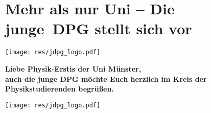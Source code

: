 \section[Die junge DPG stellt sich vor]{Mehr als nur Uni -- Die junge~DPG stellt sich vor}
\begin{minipage}{0.1\textwidth}
    \texttt{[image: res/jdpg\_logo.pdf]}
\end{minipage}\hfill
\begin{minipage}{0.75\textwidth}
    \centering
    \textbf{Liebe Physik-Erstis der Uni Münster,\\
    auch die junge DPG möchte Euch herzlich im Kreis der Physikstudierenden begrüßen.}
\end{minipage}\hfill
\begin{minipage}{0.1\textwidth}
    \texttt{[image: res/jdpg\_logo.pdf]}
\end{minipage}

